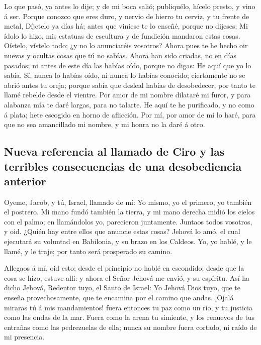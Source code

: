  Lo que pasó, ya antes lo dije; y de mi boca salió;
publiquélo, hícelo presto, y vino á ser.  Porque conozco
que eres duro, y nervio de hierro tu cerviz, y tu frente de metal,
 Díjetelo ya días há; antes que viniese te lo enseñé,
porque no dijeses: Mi ídolo lo hizo, mis estatuas de escultura y de
fundición mandaron estas cosas.  Oístelo, vístelo todo; ¿y
no lo anunciaréis vosotros? Ahora pues te he hecho oir nuevas y ocultas
cosas que tú no sabías.  Ahora han sido criadas, no en
días pasados; ni antes de este día las habías oído, porque no digas: He
aquí que yo lo sabía.  Sí, nunca lo habías oído, ni nunca
lo habías conocido; ciertamente no se abrió antes tu oreja; porque sabía
que desleal habías de desobedecer, por tanto te llamé rebelde desde el
vientre.  Por amor de mi nombre dilataré mi furor, y para
alabanza mía te daré largas, para no talarte.  He aquí te
he purificado, y no como á plata; hete escogido en horno de aflicción.
 Por mí, por amor de mí lo haré, para que no sea
amancillado mi nombre, y mi honra no la daré á otro.

\hypertarget{nueva-referencia-al-llamado-de-ciro-y-las-terribles-consecuencias-de-una-desobediencia-anterior}{%
\subsection{Nueva referencia al llamado de Ciro y las terribles
consecuencias de una desobediencia
anterior}\label{nueva-referencia-al-llamado-de-ciro-y-las-terribles-consecuencias-de-una-desobediencia-anterior}}

 Oyeme, Jacob, y tú, Israel, llamado de mí: Yo mismo, yo
el primero, yo también el postrero.  Mi mano fundó
también la tierra, y mi mano derecha midió los cielos con el palmo; en
llamándolos yo, parecieron juntamente.  Juntaos todos
vosotros, y oid. ¿Quién hay entre ellos que anuncie estas cosas? Jehová
lo amó, el cual ejecutará su voluntad en Babilonia, y su brazo en los
Caldeos.  Yo, yo hablé, y le llamé, y le traje; por tanto
será prosperado su camino.

 Allegaos á mí, oid esto; desde el principio no hablé en
escondido; desde que la cosa se hizo, estuve allí: y ahora el Señor
Jehová me envió, y su espíritu.  Así ha dicho Jehová,
Redentor tuyo, el Santo de Israel: Yo Jehová Dios tuyo, que te enseña
provechosamente, que te encamina por el camino que andas.
 ¡Ojalá miraras tú á mis mandamientos! fuera entonces tu
paz como un río, y tu justicia como las ondas de la mar. 
Fuera como la arena tu simiente, y los renuevos de tus entrañas como las
pedrezuelas de ella; nunca su nombre fuera cortado, ni raído de mi
presencia.

